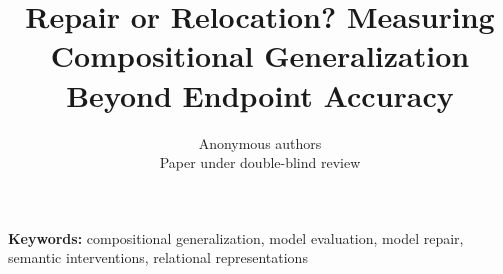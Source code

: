 \documentclass{article}
\title{Repair or Relocation? Measuring Compositional Generalization Beyond Endpoint Accuracy}
\author{Anonymous authors\\Paper under double-blind review}
\begin{document}
\maketitle
\begin{abstract}

\end{abstract}
\noindent\textbf{Keywords:} compositional generalization, model evaluation, model repair, semantic interventions, relational representations

\label{lastmainpage}
\clearpage



\clearpage
\appendix

\end{document}
